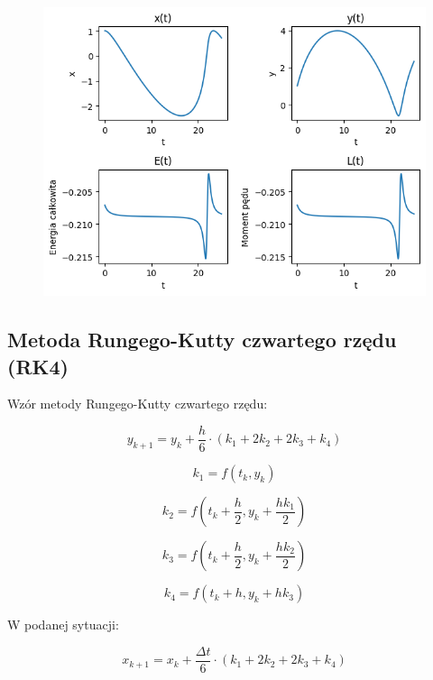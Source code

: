 \documentclass{article}
\begin{document}
	\begin{figure}[h]
		\centering
		\includegraphics[scale = 0.70]{wykres6.png}
	\end{figure}

	\newpage

	\subsection*{Metoda Rungego-Kutty czwartego rzędu (RK4)}

	Wzór metody Rungego-Kutty czwartego rzędu:

	\begin{equation}
		y_{k+1} = y_k + \frac{h}{6} \cdot (k_1+2k_2+2k_3+k_4)
	\end{equation}

	\begin{equation}
		k_1 = f(t_k, y_k)
	\end{equation}

	\begin{equation}
		k_2 = f(t_k+\frac{h}{2}, y_k + \frac{hk_1}{2})
	\end{equation}

	\begin{equation}
		k_3 = f(t_k+\frac{h}{2}, y_k + \frac{hk_2}{2})
	\end{equation}

	\begin{equation}
		k_4 = f(t_k+h, y_k+hk_3)
	\end{equation}

	W podanej sytuacji:

	\begin{equation}
		x_{k+1} = x_k + \frac{\Delta t}{6} \cdot (k_1 + 2k_2+2k_3+k_4)
	\end{equation}
\end{document}
